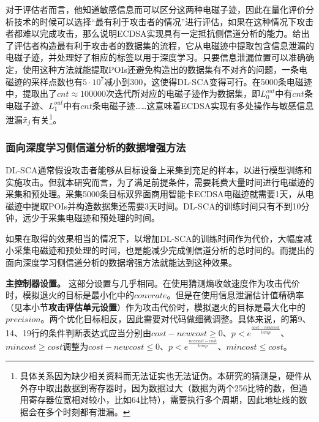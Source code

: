 {	对于评估者而言，他知道敏感信息而可以区分这两种电磁子迹，因此在量化评价分析技术的时候可以选择“最有利于攻击者的情况”进行评估，如果在这种情况下攻击者都难以完成攻击，那么说明ECDSA实现具有一定抵抗侧信道分析的能力。给出了评估者构造最有利于攻击者的数据集的流程，它从电磁迹中提取包含信息泄漏的电磁子迹，并处理好了相应的标签以用于深度学习。只要信息泄漏位置可以准确确定，使用这种方法就能提取POIs还避免构造出的数据集有不对齐的问题，一条电磁迹的采样点数也有$5\cdot10^7$减小到300，这使得DL-SCA变得可行。在5000条电磁迹中，提取出了$cnt\approx100000$次迭代所对应的电磁子迹作为数据集，即$L_0^{out}$中有$cnt$条电磁子迹、$L_1^{out}$中有$cnt$条电磁子迹……这意味着ECDSA实现有多处操作与敏感信息泄漏$\tilde {x}_j$有关\footnote{具体关系因为缺少相关资料而无法证实也无法证伪。本研究的猜测是，硬件从外存中取出数据到寄存器时，因为数据过大（数据为两个256比特的数，但通用寄存器位宽相对较小，比如64比特），需要执行多个周期，因此地址线的数据会在多个时刻都有泄漏。}。
	
	\subsubsection{面向深度学习侧信道分析的数据增强方法}
	DL-SCA通常假设攻击者能够从目标设备上采集到充足的样本，以进行模型训练和实施攻击。但就本研究而言，为了满足前提条件，需要耗费大量时间进行电磁迹的采集和预处理。采集5000条目标双界面商用智能卡ECDSA电磁迹就需要1天，从电磁迹中提取POIs并构造数据集还需要3天时间。DL-SCA的训练时间只有不到10分钟，远少于采集电磁迹和预处理的时间。
	
	如果在取得的效果相当的情况下，以增加DL-SCA的训练时间作为代价，大幅度减小采集电磁迹和预处理的时间，也是能减少完成侧信道分析的总时间的。而提出的面向深度学习侧信道分析的数据增强方法就能达到这种效果。
	
	\textbf{主控制器设置。}
	这部分设置与几乎相同。在使用猜测熵收敛速度作为攻击代价时，模拟退火的目标是最小化中的$convrate$。但是在使用信息泄漏估计值精确率（见本小节\textbf{攻击评估单元设置}）作为攻击代价时，模拟退火的目标是最大化中的$precision$。两个优化目标相反，因此需要对代码做细微调整。具体来说，的第9、14、19行的条件判断表达式应当分别由$cost-newcost\ge0$、$p<e^{\frac{cost-newcost}{temp}}$、$mincost\ge cost$调整为$cost-newcost\le0$、$p<e^{\frac{newcost-cost}{temp}}$、$mincost\le cost$。
	
}

